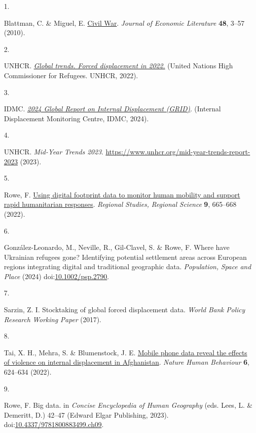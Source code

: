 \documentclass[
  11pt,
]{article}
\newlength{\cslhangindent}
\newlength{\csllabelwidth}
\newenvironment{CSLReferences}[2] %
 {\begin{list}{}{%
  \setlength{\itemindent}{0pt}
  \setlength{\leftmargin}{0pt}
  \setlength{\parsep}{0pt}
  \ifodd #1
   \setlength{\leftmargin}{\cslhangindent}
   \setlength{\itemindent}{-1\cslhangindent}
  \fi
  \setlength{\itemsep}{#2\baselineskip}}}
 {\end{list}}
\newcommand{\CSLLeftMargin}[1]{\parbox[t]{\csllabelwidth}{\strut#1\strut}}
\newcommand{\CSLRightInline}[1]{\parbox[t]{\linewidth - \csllabelwidth}{\strut#1\strut}}
\begin{document}
\label{refs}
\begin{CSLReferences}{0}{0}
\CSLLeftMargin{1. }%
\CSLRightInline{Blattman, C. \& Miguel, E.
\href{https://doi.org/10.1257/jel.48.1.3}{Civil War}. \emph{Journal of
Economic Literature} \textbf{48}, 3--57 (2010).}

\CSLLeftMargin{2. }%
\CSLRightInline{UNHCR. \emph{\href{}{Global trends. Forced displacement
in 2022.}} ({United Nations High Commissioner for Refugees. UNHCR},
2022).}

\CSLLeftMargin{3. }%
\CSLRightInline{IDMC. \emph{\href{}{2024 Global Report on Internal
Displacement {(GRID)}}}. ({Internal Displacement Monitoring Centre,
IDMC}, 2024).}

\CSLLeftMargin{4. }%
\CSLRightInline{UNHCR. \emph{Mid-Year Trends 2023}.
\url{https://www.unhcr.org/mid-year-trends-report-2023} (2023).}

\CSLLeftMargin{5. }%
\CSLRightInline{Rowe, F.
\href{https://doi.org/10.1080/21681376.2022.2135458}{Using digital
footprint data to monitor human mobility and support rapid humanitarian
responses}. \emph{Regional Studies, Regional Science} \textbf{9},
665--668 (2022).}

\CSLLeftMargin{6. }%
\CSLRightInline{González-Leonardo, M., Neville, R., Gil-Clavel, S. \&
Rowe, F. Where have Ukrainian refugees gone? Identifying potential
settlement areas across European regions integrating digital and
traditional geographic data. \emph{Population, Space and Place} (2024)
doi:\href{https://doi.org/10.1002/psp.2790}{10.1002/psp.2790}.}

\CSLLeftMargin{7. }%
\CSLRightInline{Sarzin, Z. I. Stocktaking of global forced displacement
data. \emph{World Bank Policy Research Working Paper} (2017).}

\CSLLeftMargin{8. }%
\CSLRightInline{Tai, X. H., Mehra, S. \& Blumenstock, J. E.
\href{https://doi.org/10.1038/s41562-022-01336-4}{Mobile phone data
reveal the effects of violence on internal displacement in Afghanistan}.
\emph{Nature Human Behaviour} \textbf{6}, 624--634 (2022).}

\CSLLeftMargin{9. }%
\CSLRightInline{Rowe, F. Big data. in \emph{{Concise Encyclopedia of
Human Geography}} (eds. Lees, L. \& Demeritt, D.) 42--47 (Edward Elgar
Publishing, 2023).
doi:\href{https://doi.org/10.4337/9781800883499.ch09}{10.4337/9781800883499.ch09}.}


\end{CSLReferences}
\end{document}
